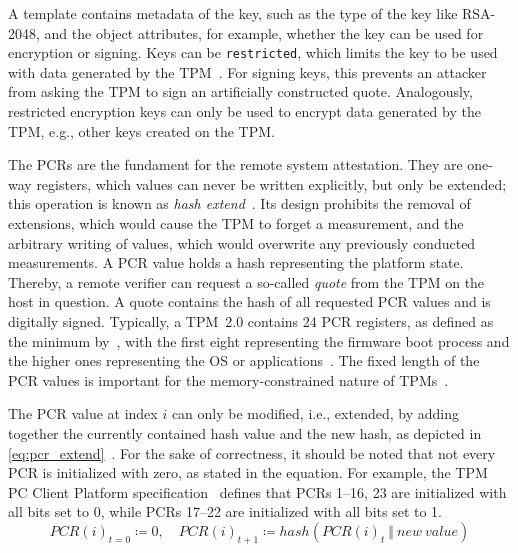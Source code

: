 A template contains metadata of the key, such as the type of the key like RSA-2048, and the object attributes, for example, whether the key can be used for encryption or signing.
Keys can be \texttt{restricted}, which limits the key to be used with data generated by the TPM~\cite{tpm20}.
For signing keys, this prevents an attacker from asking the TPM to sign an artificially constructed quote.
Analogously, restricted encryption keys can only be used to encrypt data generated by the TPM, e.g., other keys created on the TPM\@.


The \acp{PCR} are the fundament for the remote system attestation.
They are one-way registers, which values can never be written explicitly, but only be extended; this operation is known as \emph{hash extend}~\cite{Arthur2015}.
Its design prohibits the removal of extensions, which would cause the TPM to forget a measurement, and the arbitrary writing of values, which would overwrite any previously conducted measurements.
A PCR value holds a hash representing the platform state.
Thereby, a remote verifier can request a so-called \emph{quote} from the TPM on the host in question.
A quote contains the hash of all requested PCR values and is digitally signed.
Typically, a TPM~2.0 contains 24 PCR registers, as defined as the minimum by~\cite{tcgPcClientTpmProfile}, with the first eight representing the firmware boot process and the higher ones representing the OS or applications~\cite{tcgPcClientFirmwareProfile}.
The fixed length of the \ac{PCR} values is important for the memory-constrained nature of TPMs~\cite{Arthur2015}.

The PCR value at index \(i\) can only be modified, i.e., extended, by adding together the currently contained hash value and the new hash, as depicted in \autoref{eq:pcr_extend}~\cite{tpm20}.
For the sake of correctness, it should be noted that not every PCR is initialized with zero, as stated in the equation.
For example, the TPM PC Client Platform specification~\cite{tcgPcClientTpmProfile} defines that PCRs 1--16, 23 are initialized with all bits set to 0, while PCRs 17--22 are initialized with all bits set to 1.
\begin{equation}
  \label{eq:pcr_extend}
PCR(i)_{t=0} \coloneqq 0,\quad PCR(i)_{t+1} \coloneqq hash(PCR(i)_t\ \Vert\ new\ value)
\end{equation}


